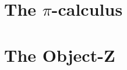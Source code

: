 

\section{The \texorpdfstring{$\pi$}{pi}-calculus}
\label{sec_pi_calculus}

\clearpage %
\section{The Object-Z}
\label{sec_oz}



